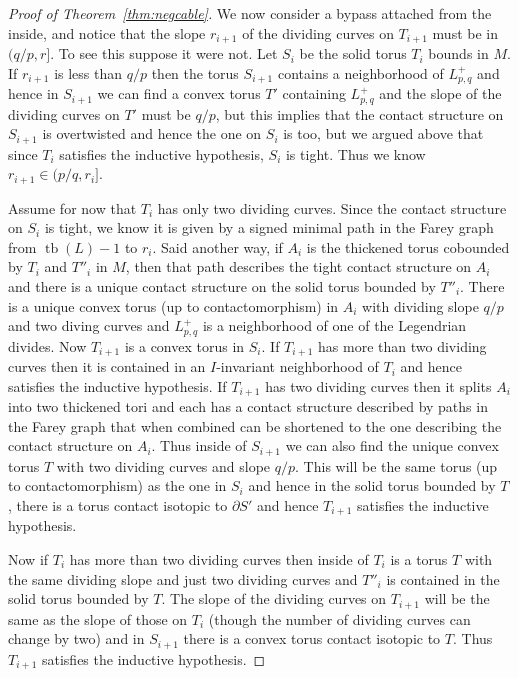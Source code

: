\documentclass[11pt]{amsart}
\theoremstyle{plain}
\theoremstyle{definition}
\theoremstyle{remark}
\numberwithin{theorem}{section}
\DeclareMathOperator\tb{tb}                   %
\begin{document}
\begin{proof}[Proof of Theorem~\ref{thm:negcable}]
We now consider a bypass attached from the inside, and notice that the slope $r_{i+1}$ of the dividing curves on $T_{i+1}$ must be in $(q/p,r]$. To see this suppose it were not. Let $S_{i}$ be the solid torus $T_{i}$ bounds in $M$. If $r_{i+1}$ is less than $q/p$ then the torus $S_{i+1}$ contains a neighborhood of $L^+_{p,q}$ and hence in $S_{i+1}$ we can find a convex torus $T'$ containing $L^+_{p,q}$ and the slope of the dividing curves on $T'$ must be $q/p$, but this implies that the contact structure on $S_{i+1}$ is overtwisted and hence the one on $S_i$ is too, but we argued above that since $T_i$ satisfies the inductive hypothesis, $S_i$ is tight. Thus we know $r_{i+1}\in(p/q,r_i]$. 

Assume for now that $T_i$ has only two dividing curves. Since the contact structure on $S_i$ is tight, we know it is given by a signed minimal path in the Farey graph from $\tb(L)-1$ to $r_i$. Said another way, if $A_i$ is the thickened torus cobounded by $T_i$ and $T''_i$ in $M$, then that path describes the tight contact structure on $A_i$ and there is a unique contact structure on the solid torus bounded by $T''_i$. There is a unique convex torus (up to contactomorphism) in $A_i$ with dividing slope $q/p$ and two diving curves and $L^+_{p,q}$ is a neighborhood of one of the Legendrian divides. Now $T_{i+1}$ is a convex torus in $S_i$. If $T_{i+1}$ has more than two dividing curves then it is contained in an $I$-invariant neighborhood of $T_i$ and hence satisfies the inductive hypothesis. If $T_{i+1}$ has two dividing curves then it splits $A_i$ into two thickened tori and each has a contact structure described by paths in the Farey graph that when combined can be shortened to the one describing the contact structure on $A_i$. Thus inside of $S_{i+1}$ we can also find the unique convex torus $T$ with two dividing curves and slope $q/p$. This will be the same torus (up to contactomorphism) as the one in $S_i$ and hence in the solid torus bounded by  $T$, there is a torus contact isotopic to $\partial S'$ and hence $T_{i+1}$ satisfies the inductive hypothesis. 

Now if $T_i$ has more than two dividing curves then inside of $T_i$ is a torus $T$ with the same dividing slope and just two dividing curves and $T''_i$ is contained in the solid torus bounded by $T$. The slope of the dividing curves on $T_{i+1}$ will be the same as the slope of those on $T_i$ (though the number of dividing curves can change by two) and in $S_{i+1}$ there is a convex torus contact isotopic to $T$. Thus $T_{i+1}$ satisfies the inductive hypothesis. 
\end{proof}
\end{document}
